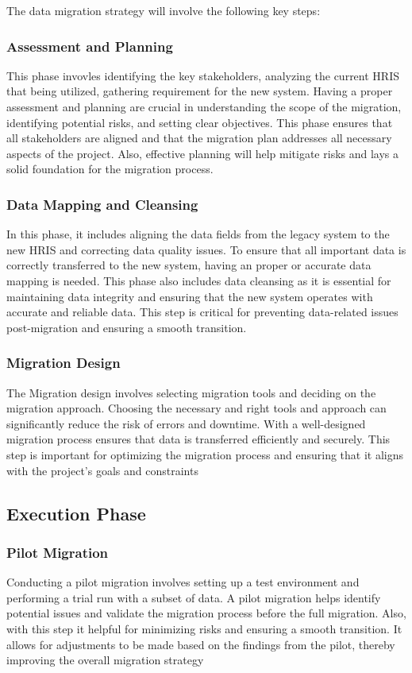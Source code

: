    The data migration strategy will involve the following key steps:
    
        \subsubsection{Assessment and Planning}
            This phase invovles identifying the key stakeholders, analyzing the current HRIS that being utilized, gathering requirement for the new system. Having a proper assessment and planning are crucial in understanding the scope of the migration, identifying potential risks, and setting clear objectives. This phase ensures that all stakeholders are aligned and that the migration plan addresses all necessary aspects of the project. Also, effective planning will help mitigate risks and lays a solid foundation for the migration process.

        \subsubsection{Data Mapping and Cleansing}
            In this phase, it includes aligning the data fields from the legacy system to the new HRIS and correcting data quality issues. To ensure that all important data is correctly transferred to the new system, having an proper or accurate data mapping is needed. This phase also includes data cleansing as it is essential for maintaining data integrity and ensuring that the new system operates with accurate and reliable data. This step is critical for preventing data-related issues post-migration and ensuring a smooth transition.

        \subsubsection{Migration Design}
            The Migration design involves selecting migration tools  and deciding on the migration approach. Choosing the necessary and right tools and approach can significantly reduce the risk of errors and downtime. With a well-designed migration process ensures that data is transferred efficiently and securely. This step is important for optimizing the migration process and ensuring that it aligns with the project’s goals and constraints
        
    \subsection{Execution Phase}
        \subsubsection{Pilot Migration}
            Conducting a pilot migration involves setting up a test environment and performing a trial run with a subset of data. A pilot migration helps identify potential issues and validate the migration process before the full migration. Also, with this step it helpful for minimizing risks and ensuring a smooth transition. It allows for adjustments to be made based on the findings from the pilot, thereby improving the overall migration strategy

